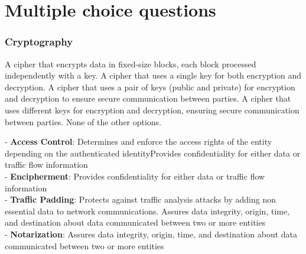 \part{Multiple choice questions}

\begin{questions}

    \section{Cryptography}





    \begin{checkboxes}
        \choice A cipher that encrypts data in fixed-size blocks, each block processed independently with a key.
        \choice A cipher that uses a single key for both encryption and decryption.
        \CorrectChoice A cipher that uses a pair of keys (public and private) for encryption and decryption to ensure secure communication between parties.
        \CorrectChoice A cipher that uses different keys for encryption and decryption, ensuring secure communication between parties.
        \choice None of the other options.
    \end{checkboxes}


    \begin{solution}
    - \textbf{Access Control}: Determines and enforce the access rights of the entity depending on the authenticated identityProvides confidentiality for either data or traffic flow information \\
    - \textbf{Encipherment}: Provides confidentiality for either data or traffic flow information \\
    - \textbf{Traffic Padding}: Protects against traffic analysis attacks by adding non essential data to network communications. Assures data integrity, origin, time, and destination about data communicated between two or more entities \\
    - \textbf{Notarization}: Assures data integrity, origin, time, and destination about data communicated between two or more entities \\
    \end{solution}


\end{questions}

